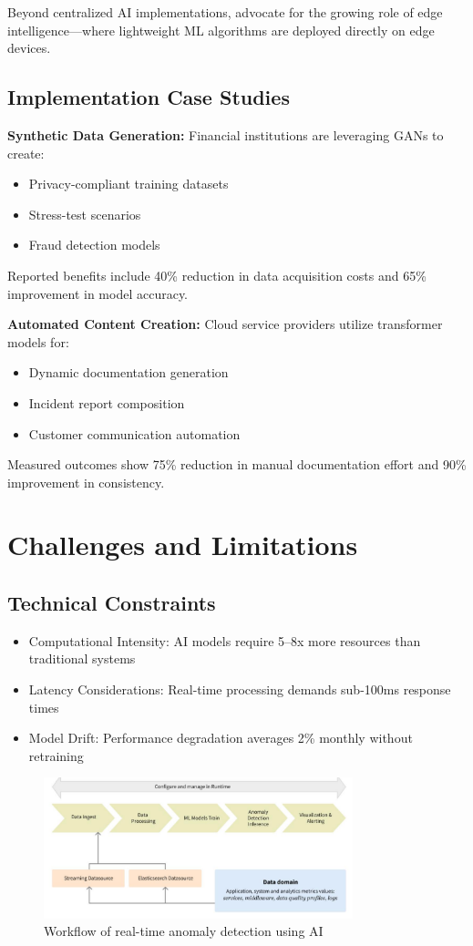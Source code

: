 \documentclass[a4paper,12pt]{article}
\begin{document}
Beyond centralized AI implementations, \citet{hoffpauir2023survey} advocate for the growing role of edge intelligence—where lightweight ML algorithms are deployed directly on edge devices.

\subsection{Implementation Case Studies}
\textbf{Synthetic Data Generation:} Financial institutions are leveraging GANs to create:
\begin{itemize}
    \item Privacy-compliant training datasets
    \item Stress-test scenarios
    \item Fraud detection models
\end{itemize}
Reported benefits include 40\% reduction in data acquisition costs and 65\% improvement in model accuracy.

\textbf{Automated Content Creation:} Cloud service providers utilize transformer models for:
\begin{itemize}
    \item Dynamic documentation generation
    \item Incident report composition
    \item Customer communication automation
\end{itemize}
Measured outcomes show 75\% reduction in manual documentation effort and 90\% improvement in consistency.

\section{Challenges and Limitations}
\subsection{Technical Constraints}
\begin{itemize}
    \item Computational Intensity: AI models require 5--8x more resources than traditional systems
    \item Latency Considerations: Real-time processing demands sub-100ms response times
    \item Model Drift: Performance degradation averages 2\% monthly without retraining
\end{itemize}

\begin{figure}[H]
    \centering
    \includegraphics[width=0.8\textwidth]{image3.png}
    \caption{Workflow of real-time anomaly detection using AI}
    \label{fig:workflow-anomaly-detection-ai}
\end{figure}
\end{document}
